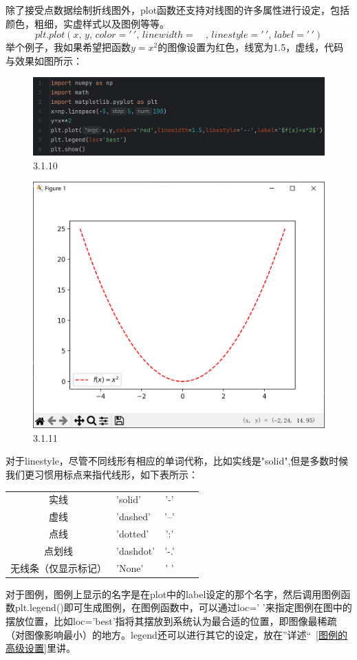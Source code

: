 \documentclass[12pt]{article}
\begin{document}
除了接受点数据绘制折线图外，plot函数还支持对线图的许多属性进行设定，包括颜色，粗细，实虚样式以及图例等等。
\[plt.plot(x,\,y,\,color='\,',\,linewidth=\quad,\,linestyle='\,',\,label='\,')\]
举个例子，我如果希望把函数\(y=x^2\)的图像设置为红色，线宽为1.5，虚线，代码与效果如图所示：

\begin{figure}[H]
    \centering
    \includegraphics[width=1\linewidth]{plot函数的其他设定 program.png}
    \caption{3.1.10}
    \label{fig:enter-label}
\end{figure}
\begin{figure}[H]
    \centering
    \includegraphics[width=0.75\linewidth]{plot函数的其他设定 picture.png}
    \caption{3.1.11}
    \label{fig:enter-label}
\end{figure}

\noindent 对于linestyle，尽管不同线形有相应的单词代称，比如实线是"solid",但是多数时候我们更习惯用标点来指代线形，如下表所示：
\begin{table}[H]
\centering
\begin{tabularx}{0.8\textwidth}{|c|>{\centering\arraybackslash}X|c|>{\centering\arraybackslash}X|X|}
实线         & 'solid'   & '-'  \\
虚线         & 'dashed'  & '--' \\
点线         & 'dotted'  & ':'  \\
点划线        & 'dashdot' & '-.' \\
无线条（仅显示标记） & 'None'    & ' ' 
\end{tabularx}
\end{table}
\noindent 对于图例，图例上显示的名字是在plot中的label设定的那个名字，然后调用图例函数plt.legend()即可生成图例，在图例函数中，可以通过loc=' '来指定图例在图中的摆放位置，比如loc='best'指将其摆放到系统认为最合适的位置，即图像最稀疏（对图像影响最小）的地方。legend还可以进行其它的设定，放在”详述“~\ref{图例的高级设置}里讲。
\end{document}
